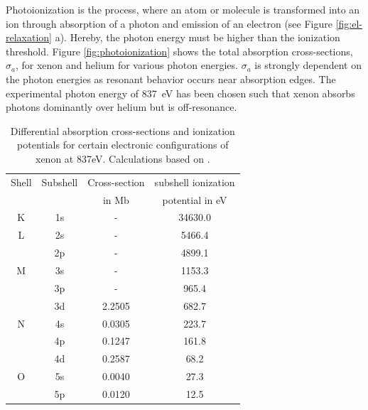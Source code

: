 %
Photoionization is the process, where an atom or molecule is transformed into an ion through absorption of a photon and emission of an electron (see Figure \ref{fig:el-relaxation} a). Hereby, the photon energy must be higher than the ionization threshold. Figure \ref{fig:photoionization} shows the total absorption cross-sections, $\sigma_{a}$, for xenon and helium for various photon energies. $\sigma_{a}$ is strongly dependent on the photon energies as resonant behavior occurs near absorption edges. The experimental photon energy of \SI{837}{\electronvolt} has been chosen such that xenon absorbs photons dominantly over helium but is off-resonance.
\begin{table}
	\centering
		\begin{tabular}{ | c | c | c | c | }
			\hline
			Shell & Subshell & Cross-section & subshell ionization \\
				&	& in Mb & potential in eV \\ \hline
			K & 1s & - & 34630.0 \\ \hline
			L & 2s & - & 5466.4  \\ 
			\ & 2p & - & 4899.1 \\ \hline
			M & 3s & - & 1153.3  \\ 
			\ & 3p & - & 965.4 \\ 
			\ & 3d & 2.2505 & 682.7 \\ \hline
			N & 4s & 0.0305 & 223.7 \\ 
			\ & 4p & 0.1247 & 161.8 \\ 
			\ & 4d & 0.2587 & 68.2  \\ \hline
			O & 5s & 0.0040 & 27.3  \\ 
			\ & 5p & 0.0120 & 12.5  \\ \hline
		\end{tabular}
	\caption[Differential absorption cross-sections and ionization potentials for xenon.]{Differential absorption cross-sections and ionization potentials for certain electronic configurations of xenon at 837eV. Calculations based on \citep{Cowan-1981-Cal}.}
	\label{tab:xenon-photoionization-cross-section}
\end{table}
